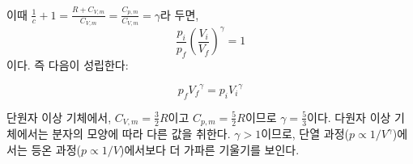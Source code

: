         이때 $\displaystyle\frac{1}{c} + 1 = \frac{R + C_{V,m}}{C_{V,m}} = \frac{C_{p,m}}{C_{V,m}} = \gamma$라 두면,
        \begin{equation*}
            \frac{p_i}{p_f}\left(\frac{V_i}{V_f}\right)^{\gamma} = 1
        \end{equation*}
        이다. 즉 다음이 성립한다:
        \begin{cor}
        \begin{equation*}
            p_f {V_f}^{\gamma} = p_i {V_i}^{\gamma}
        \end{equation*}
        \end{cor}
        \par 단원자 이상 기체에서, $\displaystyle C_{V,m} = \frac{3}{2}R$이고 $\displaystyle C_{p,m} = \frac{5}{2}R$이므로 \textbf{$\displaystyle\gamma = \frac{5}{3}$}이다. 다원자 이상 기체에서는 
        분자의 모양에 따라 다른 값을 취한다. $\gamma >1$이므로, 단열 과정($\displaystyle p \propto 1/{V^{\gamma}}$)에서는 등온 과정($\displaystyle p \propto 1/V$)에서보다 더 가파른 기울기를 보인다.